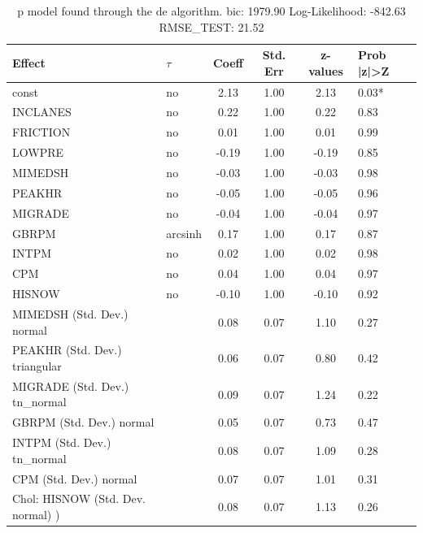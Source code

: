 \begin{table}
	\caption{p model found through the de algorithm. bic: 1979.90 Log-Likelihood: -842.63 RMSE_TEST: 21.52}
	\begin{center}
		\begin{tabular}{|l|l|c|c|c|l|}
			\hline
			Effect & $\tau$ & Coeff & Std. Err & z-values & Prob |z|>Z \\
			\hline
			const & no & 2.13 & 1.00 & 2.13 & 0.03* \\
			\hline
			INCLANES & no & 0.22 & 1.00 & 0.22 & 0.83 \\
			\hline
			FRICTION & no & 0.01 & 1.00 & 0.01 & 0.99 \\
			\hline
			LOWPRE & no & -0.19 & 1.00 & -0.19 & 0.85 \\
			\hline
			MIMEDSH & no & -0.03 & 1.00 & -0.03 & 0.98 \\
			\hline
			PEAKHR & no & -0.05 & 1.00 & -0.05 & 0.96 \\
			\hline
			MIGRADE & no & -0.04 & 1.00 & -0.04 & 0.97 \\
			\hline
			GBRPM & arcsinh & 0.17 & 1.00 & 0.17 & 0.87 \\
			\hline
			INTPM & no & 0.02 & 1.00 & 0.02 & 0.98 \\
			\hline
			CPM & no & 0.04 & 1.00 & 0.04 & 0.97 \\
			\hline
			HISNOW & no & -0.10 & 1.00 & -0.10 & 0.92 \\
			\hline
			MIMEDSH (Std. Dev.) normal &  & 0.08 & 0.07 & 1.10 & 0.27 \\
			\hline
			PEAKHR (Std. Dev.) triangular &  & 0.06 & 0.07 & 0.80 & 0.42 \\
			\hline
			MIGRADE (Std. Dev.) tn_normal &  & 0.09 & 0.07 & 1.24 & 0.22 \\
			\hline
			GBRPM (Std. Dev.) normal &  & 0.05 & 0.07 & 0.73 & 0.47 \\
			\hline
			INTPM (Std. Dev.) tn_normal &  & 0.08 & 0.07 & 1.09 & 0.28 \\
			\hline
			CPM (Std. Dev.) normal &  & 0.07 & 0.07 & 1.01 & 0.31 \\
			\hline
			 Chol: HISNOW (Std. Dev. normal) ) &  & 0.08 & 0.07 & 1.13 & 0.26 \\
			\hline
		\end{tabular}
	\end{center}
\end{table}